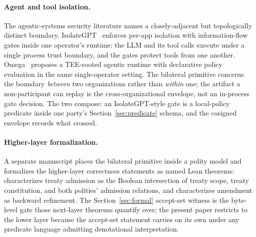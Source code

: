 \paragraph{Agent and tool isolation.} The agentic-systems security literature names a closely-adjacent but topologically distinct boundary. IsolateGPT~\cite{isolategptNDSS2025} enforces per-app isolation with information-flow gates inside one operator's runtime: the LLM and its tool calls execute under a single process trust boundary, and the gates protect tools from one another. Omega~\cite{omegaTrustlets} proposes a TEE-rooted agentic runtime with declarative policy evaluation in the same single-operator setting. The bilateral primitive concerns the boundary \emph{between} two organizations rather than \emph{within} one; the artifact a non-participant can replay is the cross-organizational envelope, not an in-process gate decision. The two compose: an IsolateGPT-style gate is a local-policy predicate inside one party's Section~\ref{sec:predicate} schema, and the cosigned envelope records what crossed.

\paragraph{Higher-layer formalization.} A separate manuscript places the bilateral primitive inside a polity model and formalizes the higher-layer correctness statements as named Lean theorems:  characterizes treaty admission as the Boolean intersection of treaty scope, treaty constitution, and both polities' admission relations, and  characterizes amendment as backward refinement. The Section~\ref{sec:formal} accept-set witness is the byte-level gate those next-layer theorems quantify over; the present paper restricts to the lower layer because the accept-set statement carries on its own under any predicate language admitting denotational interpretation.
